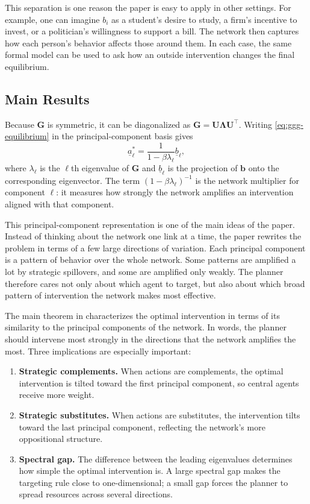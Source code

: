 \documentclass[11pt,letterpaper]{article}
\begin{document}
This separation is one reason the paper is easy to apply in other settings. For example, one can imagine $b_i$ as a student's desire to study, a firm's incentive to invest, or a politician's willingness to support a bill. The network then captures how each person's behavior affects those around them. In each case, the same formal model can be used to ask how an outside intervention changes the final equilibrium.

\subsection{Main Results}

Because $\mathbf{G}$ is symmetric, it can be diagonalized as $\mathbf{G} = \mathbf{U}\boldsymbol{\Lambda}\mathbf{U}^{\top}$. Writing \eqref{eq:ggg-equilibrium} in the principal-component basis gives
\begin{equation}
    \underline{a}^*_{\ell} = \frac{1}{1 - \beta \lambda_{\ell}} \underline{b}_{\ell},
    \label{eq:ggg-component}
\end{equation}
where $\lambda_{\ell}$ is the $\ell$th eigenvalue of $\mathbf{G}$ and $\underline{b}_{\ell}$ is the projection of $\mathbf{b}$ onto the corresponding eigenvector. The term $(1 - \beta \lambda_{\ell})^{-1}$ is the network multiplier for component $\ell$: it measures how strongly the network amplifies an intervention aligned with that component.

This principal-component representation is one of the main ideas of the paper. Instead of thinking about the network one link at a time, the paper rewrites the problem in terms of a few large directions of variation. Each principal component is a pattern of behavior over the whole network. Some patterns are amplified a lot by strategic spillovers, and some are amplified only weakly. The planner therefore cares not only about which agent to target, but also about which broad pattern of intervention the network makes most effective.

The main theorem in \citet{galeotti2020} characterizes the optimal intervention in terms of its similarity to the principal components of the network. In words, the planner should intervene most strongly in the directions that the network amplifies the most. Three implications are especially important:

\begin{enumerate}
    \item \textbf{Strategic complements.} When actions are complements, the optimal intervention is tilted toward the first principal component, so central agents receive more weight.
    \item \textbf{Strategic substitutes.} When actions are substitutes, the intervention tilts toward the last principal component, reflecting the network's more oppositional structure.
    \item \textbf{Spectral gap.} The difference between the leading eigenvalues determines how simple the optimal intervention is. A large spectral gap makes the targeting rule close to one-dimensional; a small gap forces the planner to spread resources across several directions.
\end{enumerate}
\end{document}
